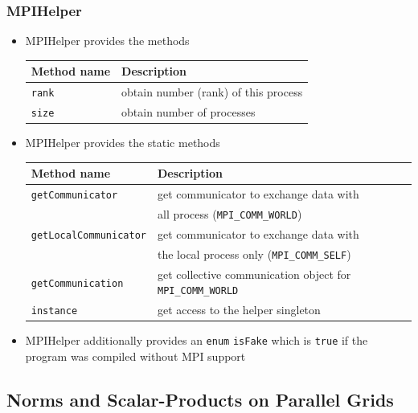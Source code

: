 \documentclass[aspectratio=169,11pt]{beamer}
\theoremstyle{definition}
\begin{document}
\begin{frame}[fragile]
  \frametitle<presentation>{MPIHelper}
  \begin{itemize}
  \item MPIHelper provides the methods\medskip

    \begin{tabular}{l|l}
      \hline
      Method name & Description\\\hline
      \lstinline!rank! & obtain number (rank) of this process\\
      \lstinline!size! & obtain number of processes \\
      \hline
    \end{tabular}\medskip
  \item MPIHelper provides the static methods\medskip

    \begin{tabular}{l|p{6cm}}
      \hline
      Method name & Description\\\hline
      \lstinline!getCommunicator! & get communicator to exchange data
      with\\ & all process (\lstinline!MPI_COMM_WORLD!)\\
      \lstinline!getLocalCommunicator! & get communicator to exchange data with\\& the local process only (\lstinline!MPI_COMM_SELF!)\\
      \lstinline!getCommunication! & get collective communication object for \lstinline!MPI_COMM_WORLD!\\
      \lstinline!instance! & get access to the helper singleton\\
      \hline
    \end{tabular} \medskip
   \item MPIHelper additionally provides an \lstinline!enum! \lstinline!isFake! which is \lstinline!true! if the program was compiled
without MPI support
 \end{itemize}
\end{frame}

\subsection{Norms and Scalar-Products on Parallel Grids}
\end{document}
